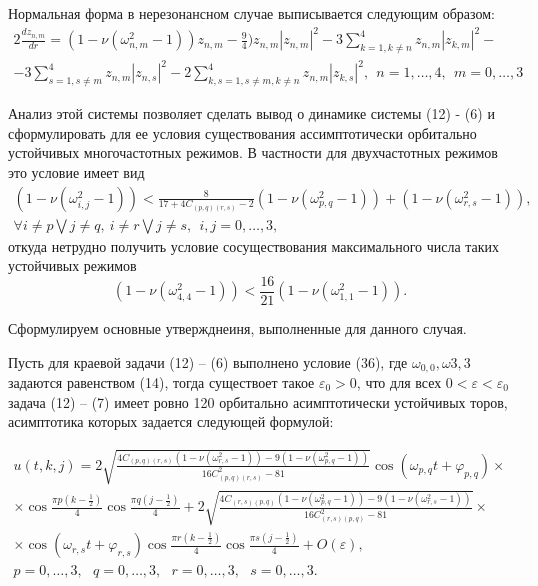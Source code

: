 \documentclass[12pt]{article}  %
\begin{document}
Нормальная форма в нерезонансном случае выписывается следующим образом:
\begin{multline}
2\frac{dz_{n,m}}{dr}=(1-\nu(\omega^2_{n,m}-1))z_{n,m} - \frac94)z_{n,m}|z_{n,m}|^2-3\sum_{k=1,k\not=n}^{4}z_{n,m}|z_{k,m}|^2-\\
	-3\sum_{s=1,s\not=m}^{4}z_{n,m}|z_{n,s}|^2 -2\sum_{k,s=1,s\not=m,k\not=n}^{4}z_{n,m}|z_{k,s}|^2, \ \ n=1,\dots,4, \ \ m=0,\dots,3
\end{multline}

Анализ этой системы позволяет сделать вывод о динамике системы (12) - (6) и сформулировать для ее условия существования ассимптотически орбитально устойчивых многочастотных режимов. В частности для двухчастотных режимов это условие имеет вид
\begin{multline}
(1-\nu(\omega^2_{i,j}-1))<\frac8{17+4C_{(p,q)(r,s)}-2}(1-\nu(\omega^2_{p,q}-1))+(1-\nu(\omega^2_{r,s}-1)),\\
\forall i\not=p \bigvee j\not=q, \  i\not=r \bigvee j\not=s, \ \ i,j=0,\dots,3,
\end{multline}
откуда нетрудно получить условие сосуществования максимального числа таких устойчивых режимов
\begin{equation}
(1-\nu(\omega^2_{4,4}-1))<\frac{16}{21}(1-\nu(\omega^2_{1,1}-1)).
\end{equation}

Сформулируем основные утвержднеиня, выполненные для данного случая.
\begin{Th}
	Пусть для краевой задачи (12) \--- (6) выполнено условие (36), где $\omega_{0,0},\omega{3,3}$ задаются равенством (14), тогда существоет такое $\varepsilon_0>0$, что для всех $0<\varepsilon<\varepsilon_0$ задача (12) \--- (7) имеет ровно 120 орбитально асимптотически устойчивых торов, асимптотика которых задается следующей формулой:
\end{Th}
\begin{multline}
u(t,k,j) = 2\sqrt{\frac{4C_{(p,q)(r,s)}(1-\nu(\omega^2_{r,s}-1))-9(1-\nu(\omega^2_{p,q}-1))}{16C^2_{(p,q)(r,s)}-81}}\cos(\omega_{p,q}t+\varphi_{p,q})\times\\
\times\cos\frac{\pi p(k-\frac{1}{2})}4\cos\frac{\pi q(j-\frac{1}{2})}4+2\sqrt{\frac{4C_{(r,s)(p,q)}(1-\nu(\omega^2_{p,q}-1))-9(1-\nu(\omega^2_{r,s}-1))}{16C^2_{(r,s)(p,q)}-81}}\times\\
\times\cos(\omega_{r,s}t+\varphi_{r,s})\cos\frac{\pi r(k-\frac{1}{2})}4\cos\frac{\pi s(j-\frac{1}{2})}4 + O(\varepsilon),\\
p=0,\dots,3, \ \ \ q=0,\dots,3, \ \ \ r=0,\dots,3, \ \ \ s=0,\dots,3.
\end{multline}
\end{document}
